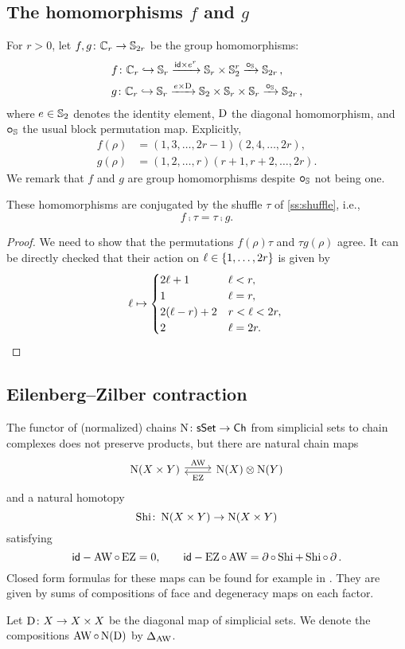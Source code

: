 \subsection{The homomorphisms $f$ and $g$}\label{ss:f and g}

For $r > 0$, let $f,g \colon \mathbb{C}_r \to \mathbb{S}_{2r}$ be the group homomorphisms:
\[
\begin{split}
	&f \colon \mathbb{C}_r \hookrightarrow \mathbb{S}_r \xrightarrow{\mathsf{id} \times e^r} \mathbb{S}_r \times \mathbb{S}_2^r \xrightarrow{\bm{\mathbin{\circ}}_{\mathbb{S}}} \mathbb{S}_{2r}\,, \\
	&g \colon \mathbb{C}_r \hookrightarrow \mathbb{S}_r \xrightarrow{e \times \mathrm{D}} \mathbb{S}_2 \times \mathbb{S}_r \times \mathbb{S}_r \xrightarrow{\bm{\mathbin{\circ}}_{\mathbb{S}}} \mathbb{S}_{2r}\,,
\end{split}
\]
where $e \in \mathbb{S}_2$ denotes the identity element, $\mathrm{D}$ the diagonal homomorphism, and $\bm{\mathbin{\circ}}_{\mathbb{S}}$ the usual block permutation map.
Explicitly,
\begin{align*}
	f(\rho) &= (1,3,\dots,2r-1)(2,4,\dots,2r), \\
	g(\rho) &= (1,2,\dots,r)(r+1,r+2,\dots,2r).
\end{align*}
We remark that $f$ and $g$ are group homomorphisms despite $\bm{\mathbin{\circ}}_{\mathbb{S}}$ not being one.

\begin{lemma}\label{l:conjugated}
	These homomorphisms are conjugated by the shuffle $\tau$ of {\rm \cref{ss:shuffle}}, i.e.,
	\[
	f \comp \tau = \tau \comp g.
	\]
\end{lemma}

\begin{proof}
	We need to show that the permutations $f(\rho) \tau$ and $\tau g(\rho)$ agree.
	It can be directly checked that their action on $\ell \in \{1,\dots,2r\}$ is given by
	\[
	\ell \mapsto
	\begin{cases}
		2\ell+1 & \ell<r,\\
		1 & \ell = r,\\
		2(\ell-r)+2 & r < \ell <2r,\\
		2 & \ell = 2r.
	\end{cases}\qedhere
	\]
\end{proof}

\subsection{Eilenberg--Zilber contraction}

The functor of (normalized) chains $\operatorname{N} \colon \mathsf{sSet} \to \mathsf{Ch}$ from simplicial sets to chain complexes does not preserve products, but there are natural chain maps
\[
\begin{tikzcd}
	\chains(X \times Y) \arrow[r,shift left=2pt,"\AW"] &
	\chains(X) \ot \chains(Y) \arrow[l,shift left=2pt,"\EZ"]
\end{tikzcd}
\]
and a natural homotopy
\[
\operatorname{Shi} \colon \operatorname{N}(X \times Y) \to \operatorname{N}(X \times Y)
\]
satisfying
\[
\mathsf{id} - \operatorname{AW} \mathbin{\circ} \operatorname{EZ} = 0, \qquad
\mathsf{id} - \operatorname{EZ} \mathbin{\circ} \operatorname{AW} = \operatorname{\partial} \mathbin{\circ} \operatorname{Shi} + \operatorname{Shi} \mathbin{\circ} \operatorname{\partial}.
\]
Closed form formulas for these maps can be found for example in \cite[56]{real2000homological}.
They are given by sums of compositions of face and degeneracy maps on each factor.

Let $\mathrm{D} \colon X \to X \times X$ be the diagonal map of simplicial sets.
We denote the compositions $\operatorname{AW} \mathbin{\circ} \operatorname{N}(\mathrm{D})$ by $\Delta_{\operatorname{AW}}$.